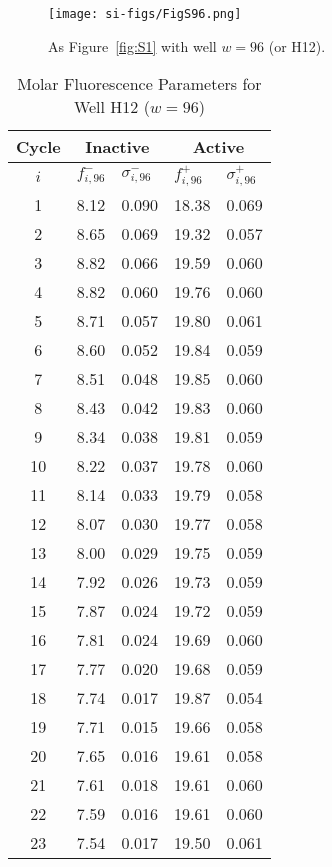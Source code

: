                 \begin{figure}
                    \centering
                    \texttt{[image: si-figs/FigS96.png]}
                    \caption{
                        As Figure~\ref{fig:S1} with well $w=96$ (or H12).
                    }
                \end{figure}
                \clearpage
    \begin{table}
        \caption{Molar Fluorescence Parameters for Well H12 ($w=96$)}
        \centering
        \begin{tabular}{c|ll|ll}
            Cycle & \multicolumn{2}{c|}{Inactive} & \multicolumn{2}{c}{Active} \\
            \hline
            $i$ & $f_{i,96}^{-}$ & $\sigma_{i,96}^{-}$ &  $f_{i,96}^{+}$ & $\sigma_{i,96}^{+}$ \\
            \hline
    1 & 8.12 & 0.090 & 18.38 & 0.069 \\
2 & 8.65 & 0.069 & 19.32 & 0.057 \\
3 & 8.82 & 0.066 & 19.59 & 0.060 \\
4 & 8.82 & 0.060 & 19.76 & 0.060 \\
5 & 8.71 & 0.057 & 19.80 & 0.061 \\
6 & 8.60 & 0.052 & 19.84 & 0.059 \\
7 & 8.51 & 0.048 & 19.85 & 0.060 \\
8 & 8.43 & 0.042 & 19.83 & 0.060 \\
9 & 8.34 & 0.038 & 19.81 & 0.059 \\
10 & 8.22 & 0.037 & 19.78 & 0.060 \\
11 & 8.14 & 0.033 & 19.79 & 0.058 \\
12 & 8.07 & 0.030 & 19.77 & 0.058 \\
13 & 8.00 & 0.029 & 19.75 & 0.059 \\
14 & 7.92 & 0.026 & 19.73 & 0.059 \\
15 & 7.87 & 0.024 & 19.72 & 0.059 \\
16 & 7.81 & 0.024 & 19.69 & 0.060 \\
17 & 7.77 & 0.020 & 19.68 & 0.059 \\
18 & 7.74 & 0.017 & 19.87 & 0.054 \\
19 & 7.71 & 0.015 & 19.66 & 0.058 \\
20 & 7.65 & 0.016 & 19.61 & 0.058 \\
21 & 7.61 & 0.018 & 19.61 & 0.060 \\
22 & 7.59 & 0.016 & 19.61 & 0.060 \\
23 & 7.54 & 0.017 & 19.50 & 0.061 \\

\end{tabular}
\end{table}
